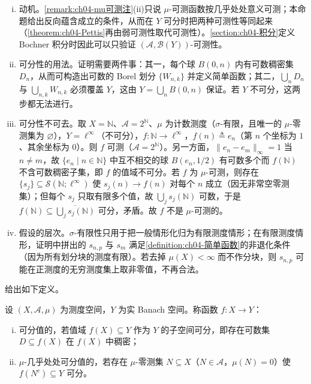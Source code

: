 \documentclass[../../main.tex]{subfiles}%
\begin{document}
\begin{remark}\label{remark:ch04-可推mu可动机}
\begin{enumerate}[(i)]
\item 动机。\cref{remark:ch04-mu可测注}(ii)只说 $\mu$-可测函数按几乎处处意义可测；本命题给出反向蕴含成立的条件，从而在 $Y$ 可分时把两种可测性等同起来（\cref{theorem:ch04-Pettis}再由弱可测性取代可测性）。\cref{section:ch04-积分}定义 Bochner 积分时因此可以只验证 $(\mathcal{A},\mathcal{B}(Y))$-可测性。
\item 可分性的用法。证明需要两件事：其一，每个球 $B(0,n)$ 内有可数稠密集 $D_n$，从而可构造出可数的 Borel 划分 $\{W_{n,k}\}$ 并定义简单函数；其二，$\bigcup_nD_n$ 与 $\bigcup_{n,k}W_{n,k}$ 必须覆盖 $Y$，这由 $Y=\bigcup_nB(0,n)$ 保证。若 $Y$ 不可分，这两步都无法进行。
\item 可分性不可去。取 $X=\mathbb{N}$、$\mathcal{A}=2^{\mathbb{N}}$、$\mu$ 为计数测度（$\sigma$-有限，且唯一的 $\mu$-零测集为 $\varnothing$），$Y=\ell^\infty$（不可分），$f:\mathbb{N}\to\ell^\infty$，$f(n)\triangleq e_n$（第 $n$ 个坐标为 $1$、其余坐标为 $0$）。则 $f$ 可测（$\mathcal{A}=2^{\mathbb{N}}$）。另一方面，$\|e_n-e_m\|_\infty=1$ 当 $n\neq m$，故 $\{e_n\mid n\in\mathbb{N}\}$ 中互不相交的球 $B(e_n,1/2)$ 有可数多个而 $f(\mathbb{N})$ 不含可数稠密子集，即 $f$ 的值域不可分。若 $f$ 为 $\mu$-可测，则存在 $\{s_j\}\subseteq\mathcal{S}(\mathbb{N};\ell^\infty)$ 使 $s_j(n)\to f(n)$ 对每个 $n$ 成立（因无非常空零测集）；但每个 $s_j$ 只取有限多个值，故 $\bigcup_js_j(\mathbb{N})$ 可数，于是 $f(\mathbb{N})\subseteq\overline{\bigcup_js_j(\mathbb{N})}$ 可分，矛盾。故 $f$ 不是 $\mu$-可测的。
\item 假设的层次。$\sigma$-有限性只用于把一般情形化归为有限测度情形；在有限测度情形，证明中拼出的 $s_{n,p}$ 与 $s_m$ 满足\cref{definition:ch04-简单函数}的非退化条件（因为所有划分块的测度有限）。若去掉 $\mu(X)<\infty$ 而不作分块，则 $s_{n,p}$ 可能在正测度的无穷测度集上取非零值，不再合法。
\end{enumerate}
\end{remark}

给出如下定义。

\begin{definition}[可分值]\label{definition:ch04-可分值}
设 $(X,\mathcal{A},\mu)$ 为测度空间，$Y$ 为实 Banach 空间。称函数 $f:X\to Y$：
\begin{enumerate}[(i)]
\item\label{item:ch04-可分值-i} 可分值的，若值域 $f(X)\subseteq Y$ 作为 $Y$ 的子空间可分，即存在可数集 $D\subseteq f(X)$ 在 $f(X)$ 中稠密；
\item\label{item:ch04-可分值-ii} $\mu$-几乎处处可分值的，若存在 $\mu$-零测集 $N\subseteq X$（$N\in\mathcal{A}$，$\mu(N)=0$）使 $f(N^c)\subseteq Y$ 可分。
\end{enumerate}
\end{definition}
\end{document}
